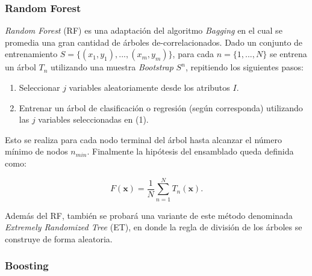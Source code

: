 \documentclass[spanish]{article}
\begin{document}
                
            \subsubsection{Random Forest}
            
                \emph{Random Forest} (RF) es una adaptación del algoritmo \emph{Bagging} en el cual se promedia una gran cantidad de árboles de-correlacionados.
                Dado un conjunto de entrenamiento $S=\{(x_1, y_1), ..., (x_m, y_m)\}$, para cada $n=\{1, ..., N\}$ se entrena un árbol $T_n$ utilizando
                una muestra \emph{Bootstrap} $S^n$, repitiendo los siguientes pasos:
                \begin{enumerate}
                    \item Seleccionar $j$ variables aleatoriamente desde los atributos $I$.
                    \item Entrenar un árbol de clasificación o regresión (según corresponda) utilizando las $j$ variables seleccionadas en (1).
                \end{enumerate}
                
                Esto se realiza para cada nodo terminal del árbol hasta alcanzar el número mínimo de nodos $n_{min}$. Finalmente la hipótesis del 
                ensamblado queda definida como:
                
                \begin{equation}
                    F(\textbf{x}) = \frac1N \sum_{n=1}^N T_n(\textbf{x}).
                \end{equation}
                
                Además del RF, también se probará una variante de este método denominada \emph{Extremely Randomized Tree} (ET), en donde la regla de división
                de los árboles se construye de forma aleatoria.%
    
                        
            \subsubsection{Boosting}
                
\end{document}

